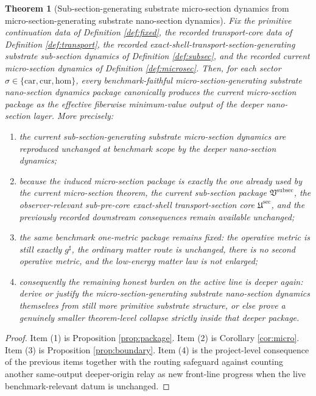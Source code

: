 \documentclass[11pt]{article}
\newcommand{\CompletedMetric}{g^{\sharp}}
\newcommand{\Car}{\mathrm{car}}
\newcommand{\Cur}{\mathrm{cur}}
\newcommand{\Hom}{\mathrm{hom}}
\newcommand{\SubPreSectionCore}{\mathfrak U^{\mathrm{sec}}}
\newcommand{\SubSectionPackage}{\mathfrak V^{\mathrm{subsec}}}
\newtheorem{theorem}{Theorem}
\begin{document}
\begin{theorem}[Sub-section-generating substrate micro-section dynamics from micro-section-generating substrate nano-section dynamics]
\label{thm:main}
Fix the primitive continuation data of Definition \ref{def:fixed}, the recorded transport-core data of Definition \ref{def:transport}, the recorded exact-shell-transport-section-generating substrate sub-section dynamics of Definition \ref{def:subsec}, and the recorded current micro-section dynamics of Definition \ref{def:microsec}. Then, for each sector \(\sigma\in\{\Car,\Cur,\Hom\}\), every benchmark-faithful micro-section-generating substrate nano-section dynamics package canonically produces the current micro-section package as the effective fiberwise minimum-value output of the deeper nano-section layer. More precisely:
\begin{enumerate}
    \item the current sub-section-generating substrate micro-section dynamics are reproduced unchanged at benchmark scope by the deeper nano-section dynamics;
    \item because the induced micro-section package is exactly the one already used by the current micro-section theorem, the current sub-section package \(\SubSectionPackage\), the observer-relevant sub-pre-core exact-shell transport-section core \(\SubPreSectionCore\), and the previously recorded downstream consequences remain available unchanged;
    \item the same benchmark one-metric package remains fixed: the operative metric is still exactly \(\CompletedMetric\), the ordinary matter route is unchanged, there is no second operative metric, and the low-energy matter law is not enlarged;
    \item consequently the remaining honest burden on the active line is deeper again: derive or justify the micro-section-generating substrate nano-section dynamics themselves from still more primitive substrate structure, or else prove a genuinely smaller theorem-level collapse strictly inside that deeper package.
\end{enumerate}
\end{theorem}

\begin{proof}
Item (1) is Proposition \ref{prop:package}. Item (2) is Corollary \ref{cor:micro}. Item (3) is Proposition \ref{prop:boundary}. Item (4) is the project-level consequence of the previous items together with the routing safeguard against counting another same-output deeper-origin relay as new front-line progress when the live benchmark-relevant datum is unchanged.
\end{proof}
\end{document}
